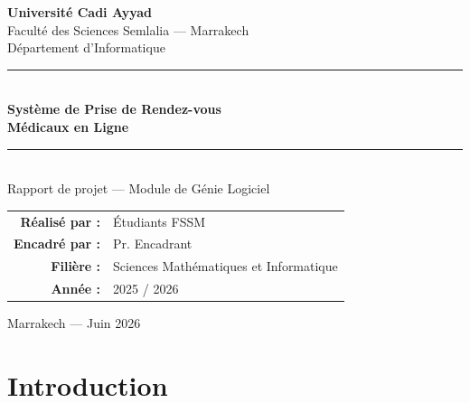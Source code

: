 \documentclass[12pt, a4paper]{article}
\begin{document}
\begin{titlepage}
  \centering
  \vspace*{1cm}

  {\Large\textbf{Université Cadi Ayyad}}\\[4pt]
  {\large Faculté des Sciences Semlalia — Marrakech}\\[4pt]
  {\large Département d'Informatique}\\[1.5cm]

  {\color{fssm-blue}\rule{0.7\textwidth}{1.5pt}}\\[1.5cm]

  {\LARGE\bfseries\color{fssm-blue} Système de Prise de Rendez-vous\\[6pt] Médicaux en Ligne}\\[1.2cm]

  {\color{fssm-blue}\rule{0.7\textwidth}{1.5pt}}\\[1.5cm]

  {\large Rapport de projet — Module de Génie Logiciel}\\[2cm]

  \begin{tabular}{rl}
    \textbf{Réalisé par :}  & Étudiants FSSM \\[6pt]
    \textbf{Encadré par :}  & Pr. Encadrant \\[6pt]
    \textbf{Filière :}      & Sciences Mathématiques et Informatique \\[6pt]
    \textbf{Année :}        & 2025 / 2026 \\
  \end{tabular}

  \vfill
  {\small Marrakech — Juin 2026}
\end{titlepage}

\tableofcontents
\newpage

\section{Introduction}
\end{document}
